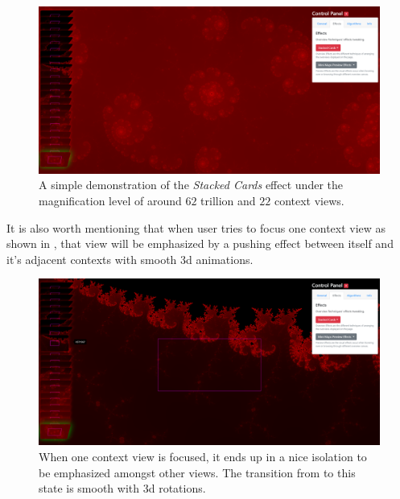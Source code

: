 \begin{figure}[H]
\centering
\includegraphics[width=\textwidth,keepaspectratio]{Figures/Chapter5/cards.png}
\decoRule
\caption[Stacked Cards Effect]{A simple demonstration of the \emph{Stacked Cards} effect under the magnification level of around $62$ trillion and $22$ context views.}
\label{fig:chap5:cards}
\end{figure}

It is also worth mentioning that when user tries to focus one context view as shown in , that view will be emphasized by a pushing effect between itself and it's adjacent contexts with smooth 3d animations.

\begin{figure}[H]
\centering
\includegraphics[width=\textwidth,keepaspectratio]{Figures/Chapter5/cards2.png}
\decoRule
\caption[Stacked Cards Effect with One Focused Context View]{When one context view is focused, it ends up in a nice isolation to be emphasized amongst other views. The transition from  to this state is smooth with 3d rotations.}
\label{fig:chap5:cards2}
\end{figure}

